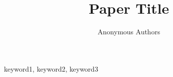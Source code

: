 \documentclass[journal]{IEEEtran}
\title{Paper Title}
\author{Anonymous Authors}
\begin{document}
\maketitle

\begin{abstract}

\end{abstract}

\begin{IEEEkeywords}
keyword1, keyword2, keyword3
\end{IEEEkeywords}












\appendices

\end{document}

